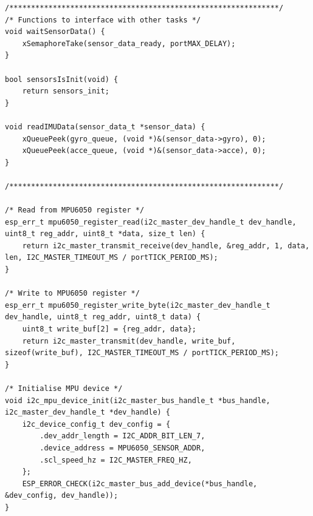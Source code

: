 \begin{lstlisting}[caption={Register Read}]
/**************************************************************/
/* Functions to interface with other tasks */
void waitSensorData() { 
    xSemaphoreTake(sensor_data_ready, portMAX_DELAY);
}

bool sensorsIsInit(void) {
    return sensors_init;
}

void readIMUData(sensor_data_t *sensor_data) {
    xQueuePeek(gyro_queue, (void *)&(sensor_data->gyro), 0);
    xQueuePeek(acce_queue, (void *)&(sensor_data->acce), 0);
}

/**************************************************************/

/* Read from MPU6050 register */
esp_err_t mpu6050_register_read(i2c_master_dev_handle_t dev_handle, uint8_t reg_addr, uint8_t *data, size_t len) {
    return i2c_master_transmit_receive(dev_handle, &reg_addr, 1, data, len, I2C_MASTER_TIMEOUT_MS / portTICK_PERIOD_MS);
}

/* Write to MPU6050 register */
esp_err_t mpu6050_register_write_byte(i2c_master_dev_handle_t dev_handle, uint8_t reg_addr, uint8_t data) {
    uint8_t write_buf[2] = {reg_addr, data};
    return i2c_master_transmit(dev_handle, write_buf, sizeof(write_buf), I2C_MASTER_TIMEOUT_MS / portTICK_PERIOD_MS);
}

/* Initialise MPU device */
void i2c_mpu_device_init(i2c_master_bus_handle_t *bus_handle, i2c_master_dev_handle_t *dev_handle) {
    i2c_device_config_t dev_config = {
        .dev_addr_length = I2C_ADDR_BIT_LEN_7,
        .device_address = MPU6050_SENSOR_ADDR,
        .scl_speed_hz = I2C_MASTER_FREQ_HZ,
    };
    ESP_ERROR_CHECK(i2c_master_bus_add_device(*bus_handle, &dev_config, dev_handle));
}
\end{lstlisting}
